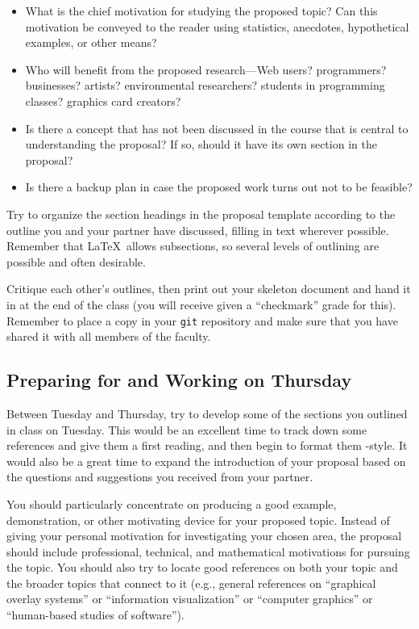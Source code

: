 \vspace*{-.05in}
\begin{itemize}
\itemsep0in

\item
What is the chief motivation for studying the proposed topic? Can this
motivation be conveyed to the reader using statistics, anecdotes, hypothetical
examples, or other means?
\item
Who will benefit from the proposed research---Web users? programmers?
businesses? artists? environmental researchers? students in programming classes? graphics card creators?
\item
Is there a concept that has not been discussed in the course that is central
to understanding the proposal? If so, should it have its own section in the
proposal?
\item
Is there a backup plan in case the proposed work turns out not to be feasible?
\end{itemize}
\vspace*{-.05in}

 Try to organize the section headings in the proposal template
according to the outline you and your partner have discussed, filling in text
wherever possible. Remember that \LaTeX\ allows subsections, so several
levels of outlining are possible and often desirable.

 Critique each other's outlines, then print out your skeleton document and hand it in at the end
of the class (you will receive given a ``checkmark'' grade for this). Remember to place a copy in your
{\tt git} repository and make sure that you have shared it with all members of the faculty.

\subsection*{Preparing for and Working on Thursday}

Between Tuesday and Thursday, try to develop some of the sections you outlined in class on Tuesday. This would be an
excellent time to track down some references and give them a first reading, and then begin to format them \BibTeX-style. It
would also be a great time to expand the introduction of your proposal based on the questions and suggestions you
received from your partner.

You should particularly concentrate on producing a good example, demonstration, or other motivating device for your
proposed topic.  Instead of giving your personal motivation for investigating your chosen area, the proposal should
include professional, technical, and mathematical motivations for pursuing the topic.  You should also try to locate
good references on both your topic and the broader topics that connect to it (e.g., general references on ``graphical
overlay systems'' or ``information visualization'' or ``computer graphics'' or ``human-based studies of software'').

